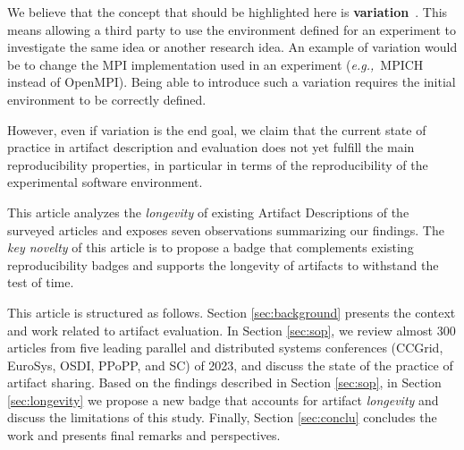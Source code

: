 \documentclass[sigconf,natbib=false]{acmart}
\newcommand{\eg}{\emph{e.g.,}}
\newcommand{\ad}{Artifact Description}
\begin{document}

We believe that the concept that should be highlighted here is \textbf{variation}\ \cite{mercier2018considering, feitelson_repeatability_2015}.
This means allowing a third party to use the environment defined for an experiment to investigate the same idea or another research idea.
An example of variation would be to change the MPI implementation used in an experiment (\eg\ MPICH instead of OpenMPI).
Being able to introduce such a variation requires the initial environment to be correctly defined.

However, even if variation is the end goal, we claim that the current state of practice in artifact description and evaluation does not yet fulfill the main reproducibility properties, in particular in terms of the reproducibility of the experimental software environment.

This article analyzes the \emph{longevity} of existing \ad s of the surveyed articles and exposes seven observations summarizing our findings.
The \textit{key novelty} of this article is to propose a badge that complements existing reproducibility badges and supports the longevity of artifacts to withstand the test of time. 

This article is structured as follows.
Section \ref{sec:background} presents the context and work related to artifact evaluation.
In Section \ref{sec:sop}, we review almost 300 articles from five leading parallel and distributed systems conferences (CCGrid, EuroSys, OSDI, PPoPP, and SC) of 2023, and discuss the state of the practice of artifact sharing.
Based on the findings described in Section \ref{sec:sop}, in Section \ref{sec:longevity} we propose a new badge that accounts for artifact \emph{longevity} and discuss the limitations of this study.
Finally, Section \ref{sec:conclu} concludes the work and presents final remarks and perspectives.
\end{document}
